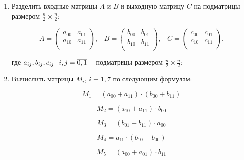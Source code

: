 \begin{enumerate}[label={\arabic*)}]
	\item Разделить входные матрицы $A$ и $B$ и выходную матрицу $C$ на подматрицы размером $\frac{n}{2} \times \frac{n}{2}$:
	
	\begin{equation*}
		A = 
		\begin{pmatrix} 
			a_{00} & a_{01}  \\
			a_{10} & a_{11}  \\ 
		\end{pmatrix},\;\;\;
		B =   
		\begin{pmatrix} 
			b_{00} & b_{01}  \\
			b_{10} & b_{11}  \\ 
		\end{pmatrix},\;\;\;
		C =   
		\begin{pmatrix} 
			c_{00} & c_{01}  \\
			c_{10} & c_{11}  \\ 
		\end{pmatrix}.
	\end{equation*}
	
	где $a_{ij}, b_{ij}, c_{ij} \hspace{0.25cm} i, j = \overline{0, 1}$ -- подматрицы размером $\frac{n}{2} \times \frac{n}{2}$;

	\item Вычислить матрицы $M_i$, $i = \overline{1, 7}$ по следующим формулам:
	
	\begin{equation}
		\label{eq:M1}
		M_1 = (a_{00} + a_{11}) \cdot (b_{00} + b_{11})
	\end{equation}

	\begin{equation}
		\label{eq:M2}
		M_2 = (a_{10} + a_{11}) \cdot b_{00}
	\end{equation}

	\begin{equation}
		\label{eq:M3}
		M_3 = (b_{01} - b_{11}) \cdot a_{00}
	\end{equation}
	
	\begin{equation}
		\label{eq:M4}
		M_4 = a_{11} \cdot (b_{10} - b_{00})
	\end{equation}

	\begin{equation}
		\label{eq:M5}
		M_5 = (a_{00} + a_{01}) \cdot b_{11}
	\end{equation}


\end{enumerate}
